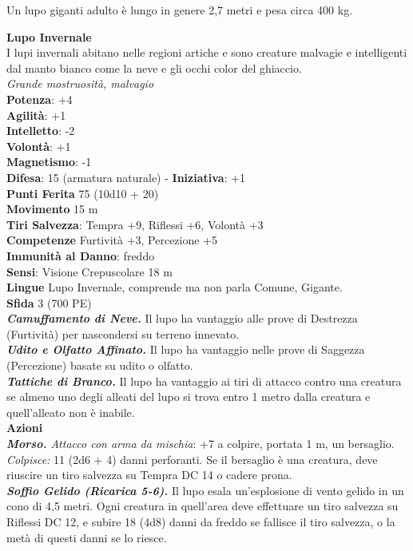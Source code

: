 \begin{multicols}{2}
Un lupo giganti adulto è lungo in genere 2,7 metri e pesa circa 400 kg. 

\medskip\textbf{Lupo Invernale}\\
I lupi invernali abitano nelle regioni artiche e sono creature malvagie e intelligenti dal manto bianco come la neve e gli occhi color del ghiaccio.\\
\emph{Grande mostruosità, malvagio}\\
\textbf{Potenza}: +4\\
\textbf{Agilità}: +1\\
\textbf{Intelletto}: -2\\
\textbf{Volontà}: +1\\
\textbf{Magnetismo}: -1\\
\textbf{Difesa}: 15 (armatura naturale) - \textbf{Iniziativa}: +1\\
\textbf{Punti Ferita} 75 (10d10 + 20)\\
\textbf{Movimento} 15 m\\
\textbf{Tiri Salvezza}: Tempra +9, Riflessi +6, Volontà +3 \\
\textbf{Competenze} Furtività +3, Percezione +5\\
\textbf{Immunità al Danno}: freddo\\
\textbf{Sensi}: Visione Crepuscolare 18 m\\
\textbf{Lingue}  Lupo Invernale, comprende ma non parla Comune, Gigante. \\
\textbf{Sfida} 3 (700 PE)\smallskip\\
\emph{\textbf{Camuffamento di Neve.}} Il lupo ha vantaggio alle prove di Destrezza (Furtività) per nascondersi su terreno innevato.\\
\emph{\textbf{Udito e Olfatto Affinato.}} Il lupo ha vantaggio nelle prove di Saggezza (Percezione) basate su udito o olfatto.\\
\emph{\textbf{Tattiche di Branco.}} Il lupo ha vantaggio ai tiri di attacco contro una creatura se almeno uno degli alleati del lupo si trova entro 1 metro dalla creatura e quell'alleato non è inabile.\\
\smallskip\textbf{Azioni}\\
\emph{\textbf{Morso.} Attacco con arma da mischia}: +7 a colpire, portata 1 m, un bersaglio.\\
\emph{Colpisce:} 11 (2d6 + 4) danni perforanti. Se il bersaglio è una creatura, deve riuscire un tiro salvezza su Tempra DC 14 o cadere prona.\\
\emph{\textbf{Soffio Gelido (Ricarica 5-6).}} Il lupo esala un'esplosione di vento gelido in un cono di 4,5 metri. Ogni creatura in quell'area deve effettuare un tiro salvezza su Riflessi DC 12, e subire 18 (4d8) danni da freddo se fallisce il tiro salvezza, o la metà di questi danni se lo riesce. \\

\end{multicols}
